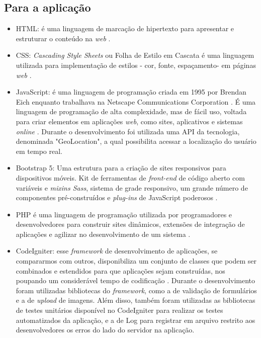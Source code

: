 \subsection{Para a aplicação}
\begin{itemize}
    \item \ac{HTML}: é uma linguagem de marcação de hipertexto para apresentar e estruturar o conteúdo na \textit{web} \cite{html}.
    
    \item \ac{CSS}: \textit{Cascading Style Sheets} ou Folha de Estilo em Cascata é uma linguagem utilizada para implementação de estilos - cor, fonte, espaçamento- em páginas \textit{web} \cite{css}.
    
    \item JavaScript: é uma linguagem de programação criada em 1995 por Brendan Eich enquanto trabalhava na Netscape Communications Corporation \cite{jsum}. É uma linguagem de programação de alta complexidade, mas de fácil uso, voltada para criar elementos em aplicações \textit{web}, como sites, aplicativos e sistemas \textit{online} \cite{jsdois}. 
    Durante o desenvolvimento foi utilizada uma \ac{API} da tecnologia, denominada "GeoLocation", a qual possibilita acessar a localização do usuário em tempo real.
    
    \item Bootstrap 5: Uma estrutura para a criação de sites responsivos para dispositivos móveis. Kit de ferramentas de \textit{front-end} de código aberto com variáveis e \textit{mixins Sass}, sistema de grade responsivo, um grande número de componentes pré-construídos e \textit{plug-ins} de JavaScript poderosos \cite{bootstrap}.
    
    \item \ac{PHP} é uma linguagem de programação utilizada por programadores e desenvolvedores para construir sites dinâmicos, extensões de integração de aplicações e agilizar no desenvolvimento de um sistema \cite{php}.
    
    \item CodeIgniter: esse \textit{framework} de desenvolvimento de aplicações, se compararmos com outros, disponibiliza um conjunto de classes que podem ser combinados e estendidos para que aplicações sejam construídas, nos poupando um considerável tempo de codificação \cite{codeigniter}.
    Durante o desenvolvimento foram utilizadas bibliotecas do \textit{framework}, como a de validação de formulários e a de \textit{upload} de imagens. Além disso, também foram utilizadas as bibliotecas de testes unitários disponível no \gls{CodeIgniter} para realizar os testes automatizados da aplicação, e a de \gls{Log} para registrar em arquivo restrito aos desenvolvedores os erros do lado do servidor na aplicação.
    

\end{itemize}
